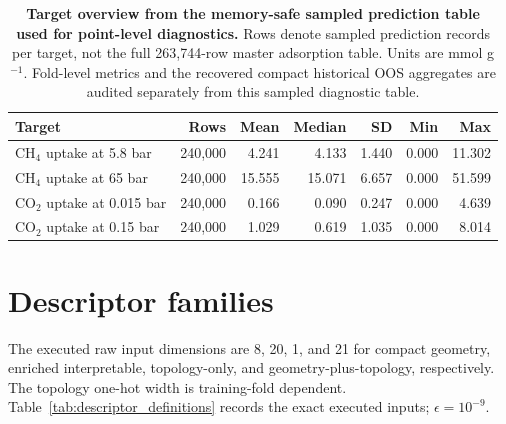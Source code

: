 \documentclass[11pt,a4paper]{article}
\begin{document}
\begin{table}[H]
\centering
\caption{\textbf{Target overview from the memory-safe sampled prediction table used for point-level diagnostics.}
Rows denote sampled prediction records per target, not the full 263,744-row master adsorption table.
Units are mmol g$^{-1}$. Fold-level metrics and the recovered compact historical OOS aggregates are
audited separately from this sampled diagnostic table.}
\label{tab:target_overview}
\begin{tabular}{lrrrrrr}
\toprule
Target & Rows & Mean & Median & SD & Min & Max \\
\midrule
CH$_4$ uptake at 5.8 bar & 240,000 & 4.241 & 4.133 & 1.440 & 0.000 & 11.302 \\
CH$_4$ uptake at 65 bar & 240,000 & 15.555 & 15.071 & 6.657 & 0.000 & 51.599 \\
CO$_2$ uptake at 0.015 bar & 240,000 & 0.166 & 0.090 & 0.247 & 0.000 & 4.639 \\
CO$_2$ uptake at 0.15 bar & 240,000 & 1.029 & 0.619 & 1.035 & 0.000 & 8.014 \\
\bottomrule
\end{tabular}
\end{table}



\section{Descriptor families}
The executed raw input dimensions are 8, 20, 1, and 21 for compact geometry, enriched interpretable, topology-only, and geometry-plus-topology, respectively. The topology one-hot width is training-fold dependent. Table~\ref{tab:descriptor_definitions} records the exact executed inputs; $\epsilon=10^{-9}$.
\end{document}
